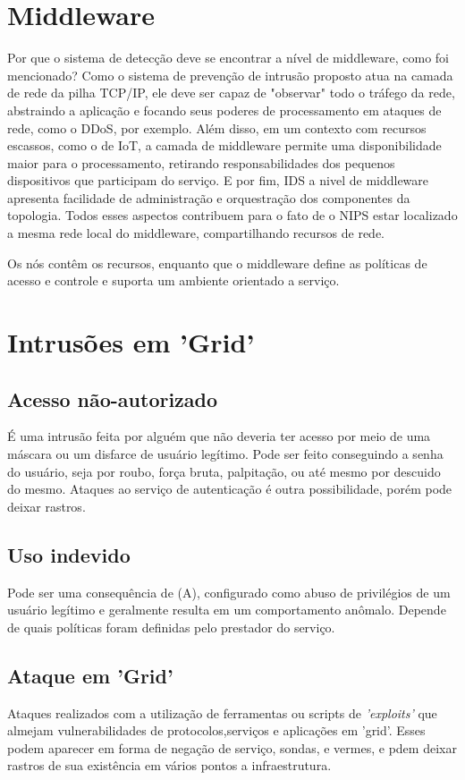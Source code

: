 \documentclass[journal]{IEEEtran}
\begin{document}
\section{Middleware}
Por que o sistema de detecção deve se encontrar a nível de middleware, como foi mencionado? Como o sistema de prevenção de intrusão proposto atua na camada de rede da pilha TCP/IP, ele deve ser capaz de "observar" todo o tráfego da rede, abstraindo a aplicação e focando seus poderes de processamento em ataques de rede, como o DDoS, por exemplo. Além disso, em um contexto com recursos escassos, como o de IoT, a camada de middleware permite uma disponibilidade maior para o processamento, retirando responsabilidades dos pequenos dispositivos que participam do serviço. E por fim, IDS a nivel de middleware apresenta facilidade de administração e orquestração dos componentes da topologia. Todos esses aspectos contribuem para o fato de o NIPS estar localizado a mesma rede local do middleware, compartilhando recursos de rede. \par
Os nós contêm os recursos, enquanto que o middleware define as políticas de acesso e controle e suporta um ambiente orientado a serviço. \par


\section{Intrusões em 'Grid'}
\subsection{Acesso não-autorizado}
É uma intrusão feita por alguém que não deveria ter acesso por meio de uma máscara ou um disfarce de usuário legítimo. Pode ser feito conseguindo a senha do usuário, seja por roubo, força bruta, palpitação, ou até mesmo por descuido do mesmo. Ataques ao serviço de autenticação é outra possibilidade, porém pode deixar rastros.
\subsection{Uso indevido}
Pode ser uma consequência de (A), configurado como abuso de privilégios de um usuário legítimo e geralmente resulta em um comportamento anômalo. Depende de quais políticas foram definidas pelo prestador do serviço.
\subsection{Ataque em 'Grid'}
Ataques realizados com a utilização de ferramentas ou scripts de \textit{'exploits'} que almejam vulnerabilidades de protocolos,serviços e aplicações em 'grid'. Esses podem aparecer em forma de negação de serviço, sondas, e vermes, e pdem deixar rastros de sua existência em vários pontos a infraestrutura.
\end{document}
